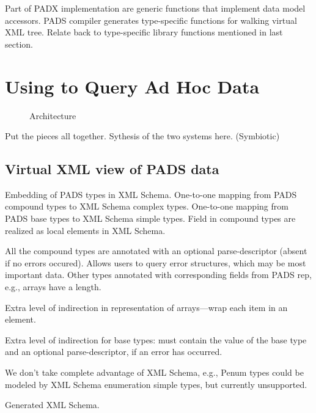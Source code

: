\documentclass{sigplanconf}
\begin{document}
Part of PADX implementation are generic functions that implement data
model accessors.  PADS compiler generates type-specific functions for
walking virtual XML tree.  Relate back to type-specific library
functions mentioned in last section.

\section{Using \padx{} to Query Ad Hoc Data}
\label{section:padx}

\begin{figure}
\begin{center}
\end{center}
\caption{\padx{} Architecture}
\label{figure:padx-arch}
\end{figure}

Put the pieces all together.  Sythesis of the two systems here. 
(Symbiotic)

\subsection{Virtual XML view of PADS data}

Embedding of PADS types in XML Schema.  One-to-one mapping from
PADS compound types to XML Schema complex types.  One-to-one mapping
from PADS base types to XML Schema simple types.  Field in compound
types are realized as local elements in XML Schema. 

All the compound types are annotated with an optional parse-descriptor
(absent if no errors occured).  Allows users to query error
structures, which may be most important data.  Other types annotated
with corresponding fields from PADS rep, e.g., arrays have a length. 

Extra level of indirection in representation of arrays---wrap each
item in an element. 

Extra level of indirection for base types: must contain the value of
the base type and an optional parse-descriptor, if an error has
occurred. 

We don't take complete advantage of XML Schema, e.g., Penum types
could be modeled by XML Schema enumeration simple types, but currently
unsupported.

Generated XML Schema.
\end{document}
